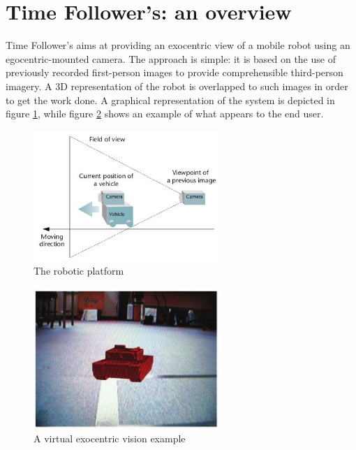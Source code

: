 \section{Time Follower's: an overview}
\label{exo:time_follower}

Time Follower's aims at providing an exocentric view of a mobile 
robot using an egocentric-mounted camera. The approach is simple: it is 
based on the use of previously recorded first-person images to provide 
comprehensible third-person imagery. A 3D representation of the robot 
is overlapped to such images in order to get the work done. A graphical
representation of the system is depicted in figure \ref{fig:exocentric}, 
while figure \ref{fig:virtualexocentric} shows an example of what appears 
to the end user.

\begin{figure}[!h]
  \begin{center}
    \includegraphics[width=200pt]{img/exocentric_vision.jpg}
    \caption{The \morduc{} robotic platform}
    \label{fig:exocentric}
  \end{center}
\end{figure}

\begin{figure}[!h]
  \begin{center}
    \includegraphics[width=200pt]{img/virtual_exocentric.jpg}  %
    \caption{A virtual exocentric vision example}
    \label{fig:virtualexocentric}
  \end{center}
\end{figure}

